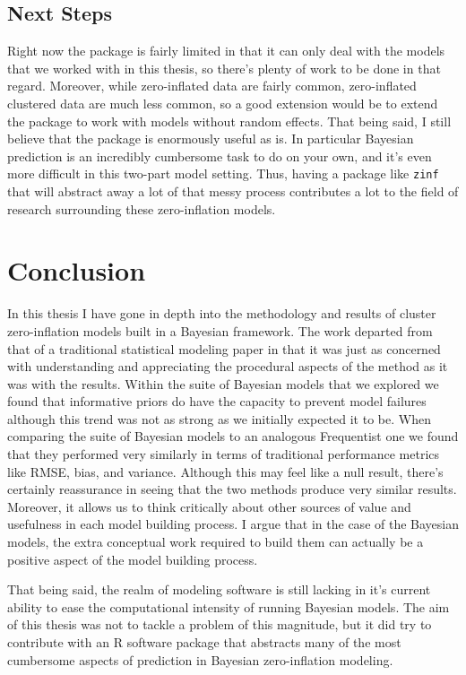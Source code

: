 \documentclass[12pt,twoside]{reedthesis}
\begin{document}
\hypertarget{next-steps}{%
\section{Next Steps}\label{next-steps}}

Right now the package is fairly limited in that it can only deal with the models that we worked with in this thesis, so there's plenty of work to be done in that regard. Moreover, while zero-inflated data are fairly common, zero-inflated clustered data are much less common, so a good extension would be to extend the package to work with models without random effects. That being said, I still believe that the package is enormously useful as is. In particular Bayesian prediction is an incredibly cumbersome task to do on your own, and it's even more difficult in this two-part model setting. Thus, having a package like \texttt{zinf} that will abstract away a lot of that messy process contributes a lot to the field of research surrounding these zero-inflation models.

\hypertarget{conc}{%
\chapter{Conclusion}\label{conc}}

In this thesis I have gone in depth into the methodology and results of cluster zero-inflation models built in a Bayesian framework. The work departed from that of a traditional statistical modeling paper in that it was just as concerned with understanding and appreciating the procedural aspects of the method as it was with the results. Within the suite of Bayesian models that we explored we found that informative priors do have the capacity to prevent model failures although this trend was not as strong as we initially expected it to be. When comparing the suite of Bayesian models to an analogous Frequentist one we found that they performed very similarly in terms of traditional performance metrics like RMSE, bias, and variance. Although this may feel like a null result, there's certainly reassurance in seeing that the two methods produce very similar results. Moreover, it allows us to think critically about other sources of value and usefulness in each model building process. I argue that in the case of the Bayesian models, the extra conceptual work required to build them can actually be a positive aspect of the model building process.

That being said, the realm of modeling software is still lacking in it's current ability to ease the computational intensity of running Bayesian models. The aim of this thesis was not to tackle a problem of this magnitude, but it did try to contribute with an R software package that abstracts many of the most cumbersome aspects of prediction in Bayesian zero-inflation modeling.
\end{document}
